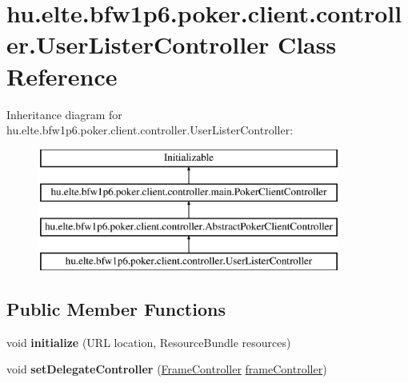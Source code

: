 \hypertarget{classhu_1_1elte_1_1bfw1p6_1_1poker_1_1client_1_1controller_1_1_user_lister_controller}{}\section{hu.\+elte.\+bfw1p6.\+poker.\+client.\+controller.\+User\+Lister\+Controller Class Reference}
\label{classhu_1_1elte_1_1bfw1p6_1_1poker_1_1client_1_1controller_1_1_user_lister_controller}
Inheritance diagram for hu.\+elte.\+bfw1p6.\+poker.\+client.\+controller.\+User\+Lister\+Controller\+:\begin{figure}[H]
\begin{center}
\leavevmode
\includegraphics[height=4.000000cm]{classhu_1_1elte_1_1bfw1p6_1_1poker_1_1client_1_1controller_1_1_user_lister_controller}
\end{center}
\end{figure}
\subsection*{Public Member Functions}
\begin{DoxyCompactItemize}
\item 
\hypertarget{classhu_1_1elte_1_1bfw1p6_1_1poker_1_1client_1_1controller_1_1_user_lister_controller_acb4caf9248ed84efe339980fb07e81bc}{}void {\bfseries initialize} (U\+R\+L location, Resource\+Bundle resources)\label{classhu_1_1elte_1_1bfw1p6_1_1poker_1_1client_1_1controller_1_1_user_lister_controller_acb4caf9248ed84efe339980fb07e81bc}

\item 
\hypertarget{classhu_1_1elte_1_1bfw1p6_1_1poker_1_1client_1_1controller_1_1_user_lister_controller_adc5adc43319401baf8d8d81b7ad74ee5}{}void {\bfseries set\+Delegate\+Controller} (\hyperlink{classhu_1_1elte_1_1bfw1p6_1_1poker_1_1client_1_1controller_1_1main_1_1_frame_controller}{Frame\+Controller} \hyperlink{classhu_1_1elte_1_1bfw1p6_1_1poker_1_1client_1_1controller_1_1_abstract_poker_client_controller_a747c3be2b66fbc23a69bfe6ebe3e4022}{frame\+Controller})\label{classhu_1_1elte_1_1bfw1p6_1_1poker_1_1client_1_1controller_1_1_user_lister_controller_adc5adc43319401baf8d8d81b7ad74ee5}

\end{DoxyCompactItemize}
